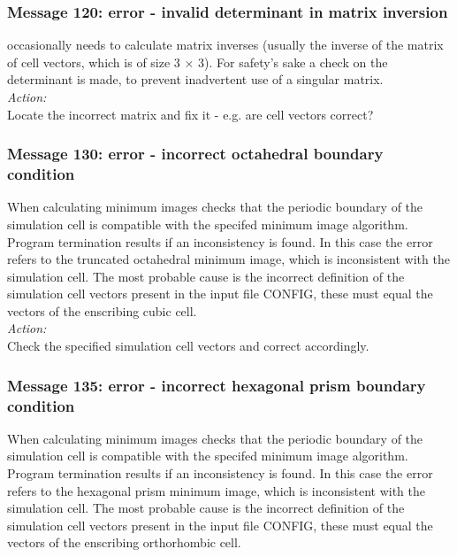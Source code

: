 \subsubsection*{Message 120: error - invalid determinant in matrix inversion}

\D{} occasionally needs to calculate matrix inverses (usually the
inverse of the matrix of cell vectors, which is of size 3 $\times$ 3).
For safety's sake a check on the determinant is made, to prevent
inadvertent use of a singular matrix. \\ 

\noindent
{\em Action:} \\ Locate the incorrect matrix and fix it - e.g. are
cell vectors correct?

\subsubsection*{Message 130: error - incorrect octahedral boundary condition}

When calculating minimum images \D{} checks that the periodic
boundary of the simulation cell is compatible with the specifed
minimum image algorithm. Program termination results if an
inconsistency is found. In this case the error refers to the truncated
octahedral minimum image, which is inconsistent with the simulation
cell. The most probable cause is the incorrect definition of the
simulation cell vectors present in the input file CONFIG, these must
equal the vectors of the enscribing cubic cell. \\ 

\noindent
{\em Action:} \\ 
Check the specified simulation cell vectors and correct accordingly.

\subsubsection*{Message 135: error - incorrect hexagonal prism boundary condition}

When calculating minimum images \D{} checks that the periodic
boundary of the simulation cell is compatible with the specifed
minimum image algorithm. Program termination results if an
inconsistency is found. In this case the error refers to the hexagonal
prism minimum image, which is inconsistent with the simulation
cell. The most probable cause is the incorrect definition of the
simulation cell vectors present in the input file CONFIG, these must
equal the vectors of the enscribing orthorhombic cell. \\ 

